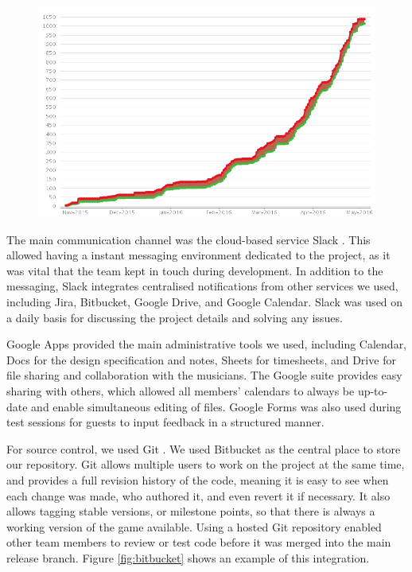 \documentclass[a4paper,11pt]{article}
\begin{document}
\begin{figure}[ht]
	\centering
    \includegraphics[width=.75\textwidth]{jira_open_vs_closed}
    \label{fig:jira_open_closed}
\end{figure}

The main communication channel was the cloud-based service Slack \cite{slack}. This allowed having a instant messaging environment dedicated to the project, as it was vital that the team kept in touch during development. In addition to the messaging, Slack integrates centralised notifications from other services we used, including Jira, Bitbucket, Google Drive, and Google Calendar. Slack was used on a daily basis for discussing the project details and solving any issues.

Google Apps \cite{google_apps} provided the main administrative tools we used, including Calendar, Docs for the design specification and notes, Sheets for timesheets, and Drive for file sharing and collaboration with the 
musicians. The Google suite provides easy sharing with others, which allowed all members’ calendars to always be up-to-date and enable simultaneous editing of files. Google Forms was also used during test sessions for guests to input feedback in a structured manner.

For source control, we used Git \cite{git}. We used Bitbucket \cite{bitbucket} as the central place to store our repository. Git allows multiple users to work on the project at the same time, and provides a full revision history of the code, meaning it is easy to see when each change was made, who authored it, and even revert it if necessary. It also allows tagging stable versions, or milestone points, so that there is always a working version of the game available. Using a hosted Git repository enabled other team members to review or test code before it was merged into the main release branch. Figure \ref{fig:bitbucket} shows an example of this integration.
\end{document}
